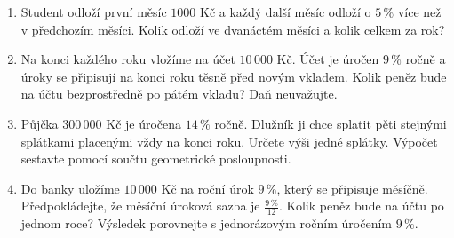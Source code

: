 \documentclass[12pt,a4paper]{article}
\begin{document}
\begin{enumerate}[label=\arabic*.,start=71]
    \item Student odloží první měsíc $1000$ Kč a každý další měsíc odloží o $5\,\%$ více než v předchozím měsíci. Kolik odloží ve dvanáctém měsíci a kolik celkem za rok?
    \item Na konci každého roku vložíme na účet $10\,000$ Kč. Účet je úročen $9\,\%$ ročně a úroky se připisují na konci roku těsně před novým vkladem. Kolik peněz bude na účtu bezprostředně po pátém vkladu? Daň neuvažujte.
    \item Půjčka $300\,000$ Kč je úročena $14\,\%$ ročně. Dlužník ji chce splatit pěti stejnými splátkami placenými vždy na konci roku. Určete výši jedné splátky. Výpočet sestavte pomocí součtu geometrické posloupnosti.
    \item Do banky uložíme $10\,000$ Kč na roční úrok $9\,\%$, který se připisuje měsíčně. Předpokládejte, že měsíční úroková sazba je $\frac{9\,\%}{12}$. Kolik peněz bude na účtu po jednom roce? Výsledek porovnejte s jednorázovým ročním úročením $9\,\%$.
\end{enumerate}
\end{document}
